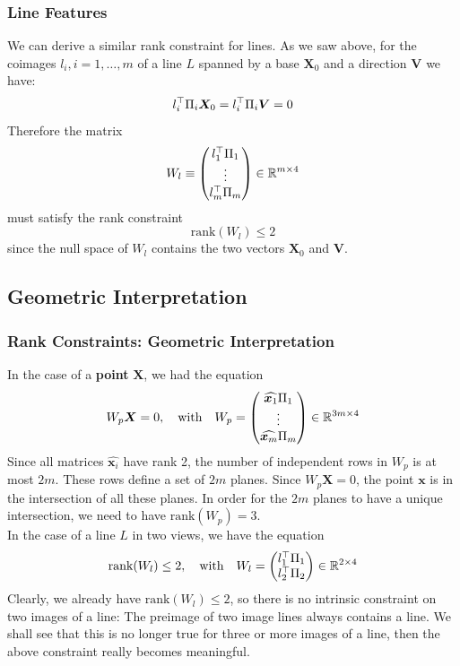 \subsubsection*{Line Features}%
\label{ssub:line_features}

We can derive a similar rank constraint for lines.
As we saw above, for the coimages $l_i, i=1, \ldots, m$ of a line $L$
spanned by a base $\bm{X}_0$ and a direction $\bm{V}$ we have:
\[
	l_i^{\top} \Pi_i \bm{X}_0 = l_i^{\top} \Pi_i \bm{V} = 0
\]
Therefore the matrix
\[
	W_l \equiv \begin{pmatrix}
		l_1^{\top} \Pi_1 \\ \vdots \\ l_m^{\top} \Pi_m
	\end{pmatrix}
	\in \mathbb{R}^{m \times{} 4}
\]
must satisfy the rank constraint
\[
	\boxed{\text{rank}(W_l) \leq 2}
\]
since the null space of $W_l$ contains the two vectors $\bm{X}_0$ and $\bm{V}$.


\subsection{Geometric Interpretation}%
\label{sub:geometric_interpretation}


\subsubsection*{Rank Constraints: Geometric Interpretation}%
\label{ssub:rank_constraints_geometric_interpretation}

In the case of a \textbf{point} $\bm{X}$, we had the equation
\[
	W_p \bm{X} = 0, \quad \text{with} \quad
	W_p = \begin{pmatrix}
			\widehat{\bm{x}_1} \Pi_1 \\ \vdots \\ \widehat{\bm{x}_m} \Pi_m
		\end{pmatrix}
		\in \mathbb{R}^{3m \times{} 4}
\]
Since all matrices $\widehat{\bm{x}_i}$ have rank 2, the number of independent
rows in $W_p$ is at most $2m$. These rows define a set of $2m$ planes.
Since $W_p \bm{X} = 0$, the point $\bm{x}$ is in the intersection of all these planes.
In order for the $2m$ planes to have a unique intersection,
we need to have $\text{rank}(W_p) = 3$.\\

In the case of a line $L$ in two views, we have the equation
\[
	\text{rank}(W_l) \leq 2, \quad \text{with} \quad
	W_l = \begin{pmatrix}
		l_1^{\top} \Pi_1 \\ l_2^{\top} \Pi_2
	\end{pmatrix}
	\in \mathbb{R}^{2 \times{} 4}
\]
Clearly, we already have $\text{rank}(W_l) \leq 2$, so there is no intrinsic
constraint on two images of a line: The preimage of two image lines
always contains a line. We shall see that this is no longer true for three
or more images of a line, then the above constraint really becomes meaningful.


